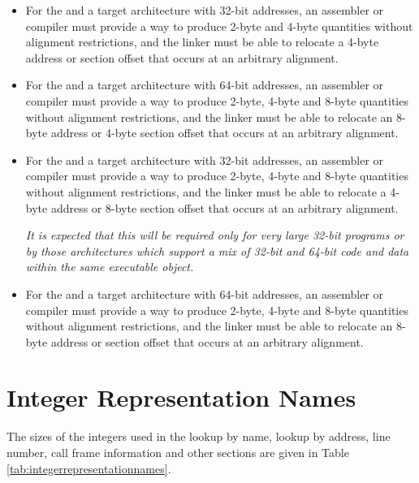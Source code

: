 \begin{itemize}
\item For the \thirtytwobitdwarfformat{} and a target architecture with
32-bit addresses, an assembler or compiler must provide a way
to produce 2-byte and 4-byte quantities without alignment
restrictions, and the linker must be able to relocate a
4-byte address or 
section offset that occurs at an arbitrary
alignment.

\item For the \thirtytwobitdwarfformat{} and a target architecture with
64-bit addresses, an assembler or compiler must provide a
way to produce 2-byte, 4-byte and 8-byte quantities without
alignment restrictions, and the linker must be able to relocate
an 8-byte address or 4-byte 
section offset that occurs at an
arbitrary alignment.

\item For the \sixtyfourbitdwarfformat{} and a target architecture with
32-bit addresses, an assembler or compiler must provide a
way to produce 2-byte, 4-byte and 8-byte quantities without
alignment restrictions, and the linker must be able to relocate
a 4-byte address or 8-byte 
section offset that occurs at an
arbitrary alignment.

\textit{It is expected that this will be required only for very large
32-bit programs or by those architectures which support
a mix of 32-bit and 64-bit code and data within the same
executable object.}

\item For the \sixtyfourbitdwarfformat{} and a target architecture with
64-bit addresses, an assembler or compiler must provide a
way to produce 2-byte, 4-byte and 8-byte quantities without
alignment restrictions, and the linker must be able to
relocate an 8-byte address or 
section offset that occurs at
an arbitrary alignment.
\end{itemize}

\section{Integer Representation Names}
\label{datarep:integerrepresentationnames}
The sizes of the integers used in the lookup by name, lookup
by address, line number, call frame information and other sections
are given in
Table \ref{tab:integerrepresentationnames}.

